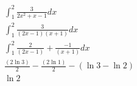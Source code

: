 \[ \begin{array} { c } \int _ { 1 } ^ { 2 } \frac { 3 } { 2 x ^ { 2 } + x - 1 } d x \\ \int _ { 1 } ^ { 2 } \frac { 3 } { ( 2 x - 1 ) ( x + 1 ) } d x \\ \int _ { 1 } ^ { 2 } \frac { 2 } { ( 2 x - 1 ) } + \frac { - 1 } { ( x + 1 ) } d x \\ \frac { ( 2 \ln 3 ) } { 2 } - \frac { ( 2 \ln 1 ) } { 2 } - ( \ln 3 - \ln 2 ) \\ \ln 2 \end{array} \]